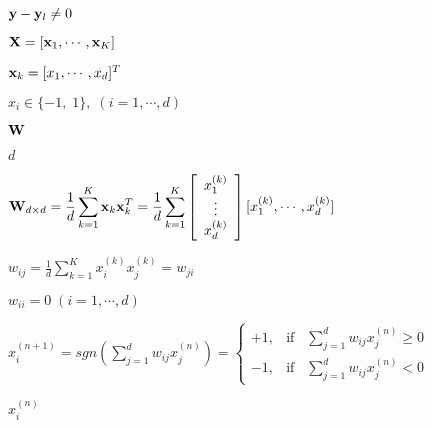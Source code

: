 \documentclass{article}
\def\lthtmlcheckvsize{\ifdim\ht\sizebox<\vsize 
  \ifdim\wd\sizebox<\hsize\expandafter\hfill\fi \expandafter\vfill
  \else\expandafter\vss\fi}%
\begin{document}
{\newpage\clearpage
{}%
$ {\bf y}-{\bf y}_l \neq 0$%
\lthtmlindisplaymathZ
\lthtmlcheckvsize\clearpage}

{\newpage\clearpage
{}%
$ {\bf X}=[{\bf x}_1,\cdots,{\bf x}_K]$%
\lthtmlindisplaymathZ
\lthtmlcheckvsize\clearpage}

{\newpage\clearpage
{}%
$ {\bf x}_k=[x_1,\cdots,x_d]^T$%
\lthtmlindisplaymathZ
\lthtmlcheckvsize\clearpage}

{\newpage\clearpage
{}%
$ x_i \in\{-1,\;1\},\;(i=1,\cdots,d)$%
\lthtmlindisplaymathZ
\lthtmlcheckvsize\clearpage}

{\newpage\clearpage
{}%
$ {\bf W}$%
\lthtmlindisplaymathZ
\lthtmlcheckvsize\clearpage}

{\newpage\clearpage
{}%
$ d$%
\lthtmlindisplaymathZ
\lthtmlcheckvsize\clearpage}

{\newpage\clearpage
{}%
$\displaystyle {\bf W}_{d\times d}=\frac{1}{d}\sum_{k=1}^K {\bf x}_k {\bf x}_k^T
= \frac{1}{d}\sum_{k=1}^K
\left[ \begin{array}{c} x_1^{(k)} \\\vdots \\x_d^{(k)} \end{array} \right]
[ x_1^{(k)}, \cdots, x_d^{(k)} ]$%
\lthtmlindisplaymathZ
\lthtmlcheckvsize\clearpage}

{\newpage\clearpage
{}%
$\displaystyle w_{ij}=\frac{1}{d}\sum_{k=1}^K x_i^{(k)} x_j^{(k)}=w_{ji}$%
\lthtmlindisplaymathZ
\lthtmlcheckvsize\clearpage}

{\newpage\clearpage
{}%
$ w_{ii}=0\;(i=1,\cdots,d)$%
\lthtmlindisplaymathZ
\lthtmlcheckvsize\clearpage}

{\newpage\clearpage
{}%
$\displaystyle x_i^{(n+1)}=sgn \left(\sum_{j=1}^d w_{ij}x_j^{(n)}\right)
=\left\{ \begin{array}{ll}
+1, & \mbox{if}\;\;\;\sum_{j=1}^d w_{ij}x_j^{(n)} \geq 0 \\
-1, & \mbox{if}\;\;\;\sum_{j=1}^d w_{ij}x_j^{(n)}  < 0 \end{array} \right.$%
\lthtmlindisplaymathZ
\lthtmlcheckvsize\clearpage}

{\newpage\clearpage
{}%
$ x_i^{(n)}$%
\lthtmlindisplaymathZ
\lthtmlcheckvsize\clearpage}
\end{document}
